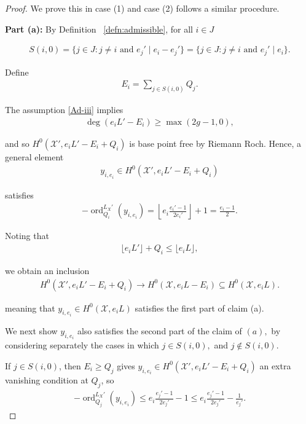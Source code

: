 \documentclass{amsart}
\theoremstyle{plain}
\theoremstyle{definition}
\theoremstyle{remark}
\numberwithin{equation}{section}
\DeclareMathOperator{\ord}{ord}
\newcommand\sx{\mathscr X}
\newcommand \subhalf[1]{\frac{{#1} - 1}{2{#1}}}
\newcommand{\halfcan}{L}
\begin{document}
\begin{proof}
We prove this in case (1) and case (2) follows a similar procedure.

{\bf Part (a):} 
By Definition ~\ref{defn:admissible}, for all $i\in J$

\begin{align*}
	S(i,0) = \{j \in J : j \neq i \text{ and }e_j' \mid e_i-e_j'\} = \{j \in J : j \neq i \text{ and }e_j' \mid e_i\}.
\end{align*}

\noindent
Define
\begin{align*}
	E_i = \sum_{j \in S(i,0)}^{}Q_j.
\end{align*}

\noindent
The assumption \ref{Ad-iii} implies
\begin{align*}
	\deg \left( e_i L' - E_i \right) \geq \max(2g - 1,0),
\end{align*}

\noindent
and so $H^0(\sx', e_iL'-E_i + Q_i)$ is base point free by 
Riemann Roch.
Hence, a general element
\begin{align*}
	y_{i, e_i} \in H^0(\sx', e_iL'-E_i + Q_i)
\end{align*}

\noindent
satisfies
\begin{align*}
	-\ord_{Q_i}
^{\halfcan_X'}(y_{i, e_i}) = \left\lfloor e_i \subhalf {e_i'} \right\rfloor + 1 =
	\frac{e_i - 1}{2}.
\end{align*}


Noting that
\begin{align*}
	\lfloor e_i L' \rfloor + Q_i \leq \lfloor e_i L \rfloor,
\end{align*}

\noindent
we obtain an inclusion
\begin{align*}
	H^0(\sx', e_iL'-E_i + Q_i) \rightarrow H^0(\sx, e_iL - E_i) \subseteq 
H^0(\sx, e_iL).
\end{align*}

\noindent
meaning that $y_{i,e_i}\in H^0(\sx,e_iL)$ satisfies the first part of claim (a).


We next show $y_{i, e_i}$ also satisfies the second part of the
claim of $(a),$ by considering separately the cases in which $j
\in S(i, 0),$ and $j \notin S(i,0)$.

If $j \in S(i,0)$, then $E_i \geq Q_j$ gives $y_{i, e_i} \in H^0
(\sx', e_iL'-E_i + Q_i)$ an extra vanishing condition at $Q_j$, so
\begin{align*}
	-\ord_{Q_j}
^{\halfcan_X'}(y_{i, e_i}) \leq e_i\subhalf {e_j'} - 1 \leq e_i 
	\subhalf{e_j'} - \frac{1}{e_j'}.
\end{align*}


\end{proof}
\end{document}
